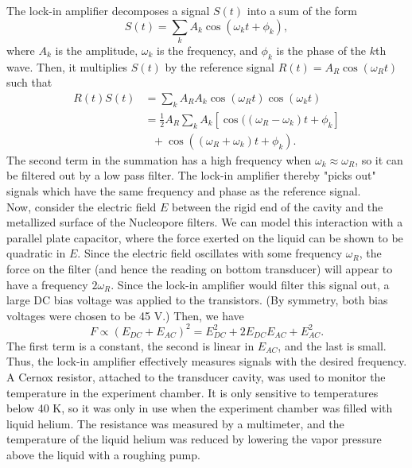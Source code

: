\documentclass[prb,aps,twocolumn,showpacs,10pt]{revtex4-1}
\begin{document}
The lock-in amplifier decomposes a signal $S(t)$ into a sum of the form
\begin{equation}
S(t) = \sum_k A_k \cos(\omega_k t + \phi_k),
\end{equation}
where $A_k$ is the amplitude, $\omega_k$ is the frequency, and $\phi_k$ is the phase of the $k$th wave. Then, it multiplies $S(t)$ by the reference signal $R(t)=A_R\cos(\omega_R t)$ such that
\begin{align*}
R(t)S(t)&=\sum_k A_R A_k \cos(\omega_R t) \cos(\omega_k t)\\
&=\frac{1}{2} A_R \sum_k A_k [\cos((\omega_R-\omega_k)t+\phi_k]\\
& \ \ \ + \cos((\omega_R+\omega_k)t+\phi_k).
\end{align*}
The second term in the summation has a high frequency when $\omega_k \approx \omega_R$, so it can be filtered out by a low pass filter. The lock-in amplifier thereby "picks out" signals which have the same frequency and phase as the reference signal. \\

Now, consider the electric field $E$ between the rigid end of the cavity and the metallized surface of the Nucleopore filters. We can model this interaction with a parallel plate capacitor, where the force exerted on the liquid can be shown to be quadratic in $E$\cite{phy}. Since the electric field oscillates with some frequency $\omega_R$, the force on the filter (and hence the reading on bottom transducer) will appear to have a frequency $2\omega_R$. Since the lock-in amplifier would filter this signal out, a large DC bias voltage was applied to the transistors. (By symmetry, both bias voltages were chosen to be 45 V.) Then, we have
\begin{equation}
F\propto (E_{DC}+E_{AC})^2 = E_{DC}^2 + 2E_{DC}E_{AC} + E_{AC}^2.
\end{equation}
The first term is a constant, the second is linear in $E_{AC}$, and the last is small. Thus, the lock-in amplifier effectively measures signals with the desired frequency. \\

A Cernox resistor, attached to the transducer cavity, was used to monitor the temperature in the experiment chamber. It is only sensitive to temperatures below 40 K, so it was only in use when the experiment chamber was filled with liquid helium. The resistance was measured by a multimeter, and the temperature of the liquid helium was reduced by lowering the vapor pressure above the liquid with a roughing pump. 
\end{document}
